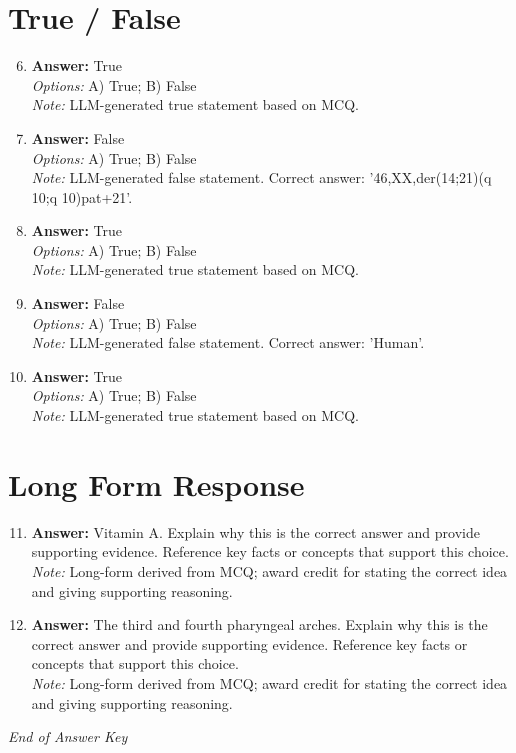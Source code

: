 \documentclass[12pt]{article}
\begin{document}
\section*{True / False}
\begin{enumerate}[label=\arabic*.]
\setcounter{enumi}{5}
\item \textbf{Answer:} True
\\ \textit{Options:} A) True; B) False
\\ \textit{Note:} LLM-generated true statement based on MCQ.
\item \textbf{Answer:} False
\\ \textit{Options:} A) True; B) False
\\ \textit{Note:} LLM-generated false statement. Correct answer: '46,XX,der(14;21)(q 10;q 10)pat+21'.
\item \textbf{Answer:} True
\\ \textit{Options:} A) True; B) False
\\ \textit{Note:} LLM-generated true statement based on MCQ.
\item \textbf{Answer:} False
\\ \textit{Options:} A) True; B) False
\\ \textit{Note:} LLM-generated false statement. Correct answer: 'Human'.
\item \textbf{Answer:} True
\\ \textit{Options:} A) True; B) False
\\ \textit{Note:} LLM-generated true statement based on MCQ.
\end{enumerate}

\section*{Long Form Response}
\begin{enumerate}[label=\arabic*.]
\setcounter{enumi}{10}
\item \textbf{Answer:} Vitamin A. Explain why this is the correct answer and provide supporting evidence. Reference key facts or concepts that support this choice.
\\ \textit{Note:} Long-form derived from MCQ; award credit for stating the correct idea and giving supporting reasoning.
\item \textbf{Answer:} The third and fourth pharyngeal arches. Explain why this is the correct answer and provide supporting evidence. Reference key facts or concepts that support this choice.
\\ \textit{Note:} Long-form derived from MCQ; award credit for stating the correct idea and giving supporting reasoning.
\end{enumerate}

\vfill
\noindent\textit{End of Answer Key}
\end{document}
